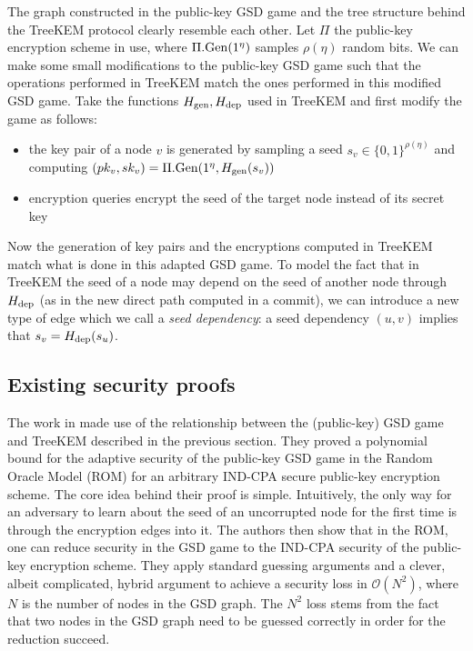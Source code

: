 The graph constructed in the public-key GSD game and the tree structure behind the TreeKEM protocol clearly resemble each other. Let $\Pi$ the public-key encryption scheme in use, where $\Pi.\mathrm{Gen}(1^\eta)$ samples $\rho(\eta)$ random bits. We can make some small modifications to the public-key GSD game such that the operations performed in TreeKEM match the ones performed in this modified GSD game. Take the functions $H_\mathrm{gen}, H_\mathrm{dep}$ used in TreeKEM and first modify the game as follows:
\begin{itemize}
	\item the key pair of a node $v$ is generated by sampling a seed $s_v \in \{0, 1\}^{\rho(\eta)}$ and computing $(pk_v, sk_v) = \Pi.\mathrm{Gen}(1^\eta, H_\mathrm{gen}(s_v))$
	\item encryption queries encrypt the seed of the target node instead of its secret key
\end{itemize}
Now the generation of key pairs and the encryptions computed in TreeKEM match what is done in this adapted GSD game. To model the fact that in TreeKEM the seed of a node may depend on the seed of another node through $H_\mathrm{dep}$ (as in the new direct path computed in a commit), we can introduce a new type of edge which we call a \emph{seed dependency}: a seed dependency $(u, v)$ implies that $s_v = H_\mathrm{dep}(s_u)$.

\subsection{Existing security proofs}

The work in \cite{ttkem} made use of the relationship between the (public-key) GSD game and TreeKEM described in the previous section. They proved a polynomial bound for the adaptive security of the public-key GSD game in the Random Oracle Model (ROM) \cite{rom} for an arbitrary IND-CPA secure public-key encryption scheme. The core idea behind their proof is simple. Intuitively, the only way for an adversary to learn about the seed of an uncorrupted node for the first time is through the encryption edges into it. The authors then show that in the ROM, one can reduce security in the GSD game to the IND-CPA security of the public-key encryption scheme. They apply standard guessing arguments and a clever, albeit complicated, hybrid argument to achieve a security loss in $\mathcal{O}(N^2)$, where $N$ is the number of nodes in the GSD graph. The $N^2$ loss stems from the fact that two nodes in the GSD graph need to be guessed correctly in order for the reduction succeed.

